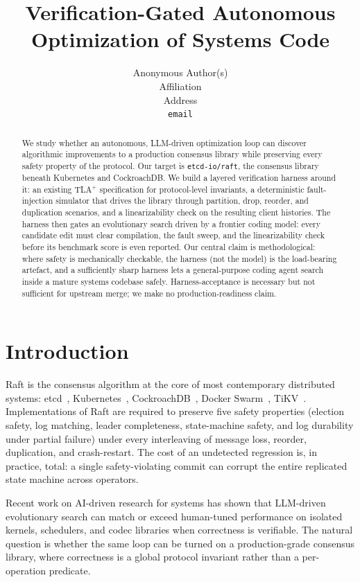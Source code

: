 \documentclass{article}
\title{Verification-Gated Autonomous Optimization of Systems Code}
\author{%
  Anonymous Author(s) \\
  Affiliation \\
  Address \\
  \texttt{email}
}
\begin{document}
\maketitle

\begin{abstract}
We study whether an autonomous, LLM-driven optimization loop can
discover algorithmic improvements to a production consensus library
while preserving every safety property of the protocol. Our target is
\texttt{etcd-io/raft}, the consensus library beneath Kubernetes and
CockroachDB. We build a layered verification harness around it: an
existing TLA$^{+}$ specification for protocol-level invariants, a
deterministic fault-injection simulator that drives the library
through partition, drop, reorder, and duplication scenarios, and a
linearizability check on the resulting client histories. The harness
then gates an evolutionary search driven by a frontier coding model:
every candidate edit must clear compilation, the fault sweep, and
the linearizability check before its benchmark score is even
reported.
Our central claim is methodological: where safety is
mechanically checkable, the harness (not the model) is the
load-bearing artefact, and a sufficiently sharp harness lets a
general-purpose coding agent search inside a mature systems codebase
safely. Harness-acceptance is necessary but not sufficient for
upstream merge; we make no production-readiness claim.
\end{abstract}

\section{Introduction}
\label{sec:intro}

Raft \cite{ongaro2014search} is the consensus algorithm at the core of
most contemporary distributed systems: etcd~\cite{etcd},
Kubernetes~\cite{kubernetes}, CockroachDB~\cite{cockroachdb},
Docker Swarm~\cite{dockerSwarm}, TiKV~\cite{tikv}. Implementations of
Raft are required to preserve
five safety properties (election safety, log matching, leader
completeness, state-machine safety, and log durability under partial
failure) under every interleaving of message loss, reorder, duplication,
and crash-restart. The cost of an undetected regression is, in
practice, total: a single safety-violating commit can corrupt the entire
replicated state machine across operators.

Recent work on AI-driven research for systems
\cite{barbarians2025,datadogHarness,datadogAutonomous} has shown that
LLM-driven evolutionary search can match or exceed human-tuned
performance on isolated kernels, schedulers, and codec libraries when
correctness is verifiable. The natural question is whether the same
loop can be turned on a production-grade consensus library, where
correctness is a global protocol invariant rather than a per-operation
predicate.
\end{document}
